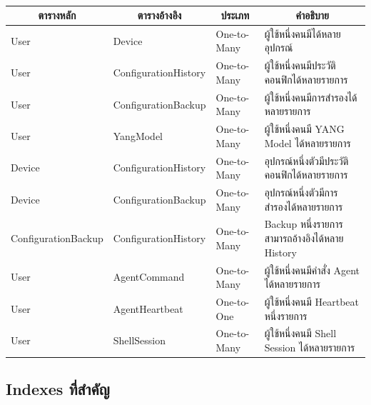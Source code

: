 \begin{table}[H]
    \caption{}
    \label{tab:table-relationships}
    \fontSixTeen 
    \begin{tabularx}{\textwidth}{|l|l|l|X|} 
        \hline
        \multicolumn{1}{|c|}{\textbf{ตารางหลัก}} & \multicolumn{1}{c|}{\textbf{ตารางอ้างอิง}} & \multicolumn{1}{c|}{\textbf{ประเภท}} & \multicolumn{1}{c|}{\textbf{คำอธิบาย}} \\
        \hline
        User & Device & One-to-Many & ผู้ใช้หนึ่งคนมีได้หลายอุปกรณ์ \\
        \hline
        User & ConfigurationHistory & One-to-Many & ผู้ใช้หนึ่งคนมีประวัติคอนฟิกได้หลายรายการ \\
        \hline
        User & ConfigurationBackup & One-to-Many & ผู้ใช้หนึ่งคนมีการสำรองได้หลายรายการ \\
        \hline
        User & YangModel & One-to-Many & ผู้ใช้หนึ่งคนมี YANG Model ได้หลายรายการ \\
        \hline
        Device & ConfigurationHistory & One-to-Many & อุปกรณ์หนึ่งตัวมีประวัติคอนฟิกได้หลายรายการ \\
        \hline
        Device & ConfigurationBackup & One-to-Many & อุปกรณ์หนึ่งตัวมีการสำรองได้หลายรายการ \\
        \hline
        ConfigurationBackup & ConfigurationHistory & One-to-Many & Backup หนึ่งรายการสามารถอ้างอิงได้หลาย History \\
        \hline
        User & AgentCommand & One-to-Many & ผู้ใช้หนึ่งคนมีคำสั่ง Agent ได้หลายรายการ \\
        \hline
        User & AgentHeartbeat & One-to-One & ผู้ใช้หนึ่งคนมี Heartbeat หนึ่งรายการ \\
        \hline
        User & ShellSession & One-to-Many & ผู้ใช้หนึ่งคนมี Shell Session ได้หลายรายการ \\
        \hline
    \end{tabularx}
\end{table}

\subsection{Indexes ที่สำคัญ}

